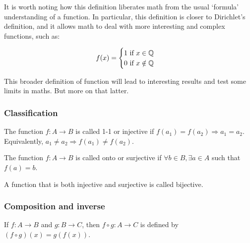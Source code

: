 It is worth noting how this definition liberates math from the usual `formula' understanding of a function. In particular, this definition is closer to Dirichlet's definition, and it allows math to deal with more interesting and complex functions, such as:

\begin{eg}
    \begin{equation*}
        f(x) = \begin{cases}
            1 \text{ if } x \in \mathbb{Q} \\
            0 \text{ if } x \notin \mathbb{Q}
        \end{cases}
    \end{equation*}
\end{eg}

\vspace{1em}
This broader definition of function will lead to interesting results and test some limits in maths. But more on that latter.

\subsubsection{Classification}

\begin{definition}
    The function $f: A \to B$ is called 1-1 or injective if $f(a_1) = f(a_2) \Rightarrow a_1 = a_2$. Equivalently, $a_1 \neq a_2 \Rightarrow f(a_1) \neq f(a_2)$.
\end{definition}

\begin{definition}
    The function $f: A \to B$ is called onto or surjective if $\forall b \in B, \exists a \in A$ such that $ f(a) = b$.
\end{definition}

\begin{definition}
    A function that is both injective and surjective is called bijective.
\end{definition}

\subsubsection{Composition and inverse}

\begin{definition}
    If $f: A \to B$ and $g: B \to C$, then $f \circ g: A \to C$ is defined by $(f \circ g)(x) = g(f(x))$.
\end{definition}

